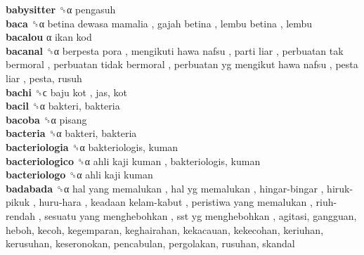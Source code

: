 \textbf{babysitter} ␝α  pengasuh  \\
\textbf{baca} ␝α   betina dewasa mamalia ,  gajah betina ,  lembu betina , lembu  \\
\textbf{bacalou} α   ikan kod   \\
\textbf{bacanal} ␝α   berpesta pora ,  mengikuti hawa nafsu ,  parti liar ,  perbuatan tak bermoral ,  perbuatan tidak bermoral ,  perbuatan yg mengikut hawa nafsu ,  pesta liar , pesta, rusuh  \\
\textbf{bachi} ␝ϲ   baju kot , jas, kot  \\
\textbf{bacil} ␝α  bakteri, bakteria  \\
\textbf{bacoba} ␝α  pisang  \\
\textbf{bacteria} ␝α  bakteri, bakteria  \\
\textbf{bacteriologia} ␝α  bakteriologis, kuman  \\
\textbf{bacteriologico} ␝α   ahli kaji kuman , bakteriologis, kuman  \\
\textbf{bacteriologo} ␝α   ahli kaji kuman   \\
\textbf{badabada} ␝α   hal yang memalukan ,  hal yg memalukan ,  hingar-bingar ,  hiruk-pikuk ,  huru-hara ,  keadaan kelam-kabut ,  peristiwa yang memalukan ,  riuh-rendah ,  sesuatu yang menghebohkan ,  sst yg menghebohkan , agitasi, gangguan, heboh, kecoh, kegemparan, keghairahan, kekacauan, kekecohan, keriuhan, kerusuhan, keseronokan, pencabulan, pergolakan, rusuhan, skandal  \\
